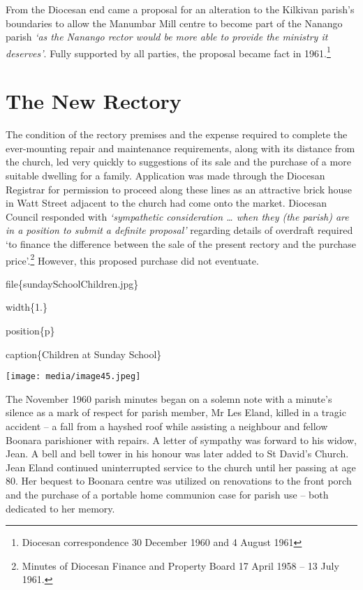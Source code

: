 From the Diocesan end came a proposal for an alteration to the Kilkivan parish's boundaries to allow the Manumbar Mill centre to become part of the Nanango parish \emph{`as the Nanango rector would be more able to provide the ministry it deserves'}. Fully supported by all parties, the proposal became fact in 1961.\footnote{Diocesan correspondence 30 December 1960 and 4 August 1961}

\hypertarget{the-new-rectory}{%
\section{The New Rectory}\label{the-new-rectory}}

The condition of the rectory premises and the expense required to complete the ever-mounting repair and maintenance requirements, along with its distance from the church, led very quickly to suggestions of its sale and the purchase of a more suitable dwelling for a family. Application was made through the Diocesan Registrar for permission to proceed along these lines as an attractive brick house in Watt Street adjacent to the church had come onto the market. Diocesan Council responded with \emph{`sympathetic consideration \ldots{} when they (the parish) are in a position to submit a definite proposal'} regarding details of overdraft required `to finance the difference between the sale of the present rectory and the purchase price'.\footnote{Minutes of Diocesan Finance and Property Board 17 April 1958 -- 13 July 1961.} However, this proposed purchase did not eventuate.

file\{sundaySchoolChildren.jpg\}

width\{1.\}

position\{p\}

caption\{Children at Sunday School\}

\texttt{[image: media/image45.jpeg]}

The November 1960 parish minutes began on a solemn note with a minute's silence as a mark of respect for parish member, Mr Les Eland, killed in a tragic accident -- a fall from a hayshed roof while assisting a neighbour and fellow Boonara parishioner with repairs. A letter of sympathy was forward to his widow, Jean. A bell and bell tower in his honour was later added to St David's Church. Jean Eland continued uninterrupted service to the church until her passing at age 80. Her bequest to Boonara centre was utilized on renovations to the front porch and the purchase of a portable home communion case for parish use -- both dedicated to her memory.

